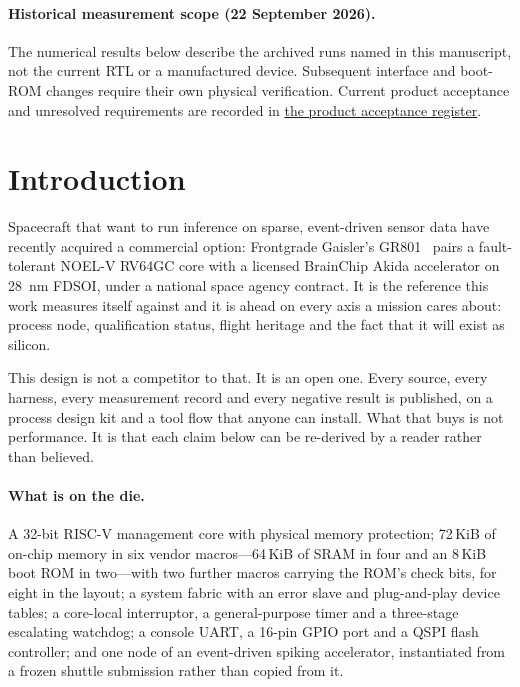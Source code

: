\documentclass[11pt,a4paper]{article}
\begin{document}
\paragraph{Historical measurement scope (22 September 2026).}
The numerical results below describe the archived runs named in this
manuscript, not the current RTL or a manufactured device. Subsequent
interface and boot-ROM changes require their own physical verification.
Current product acceptance and unresolved requirements are recorded in
\href{https://github.com/Melihakbulut221/nssoc/blob/codex/complete-open-work/docs/92-product-acceptance.md}{the product acceptance register}.


\section{Introduction}
\label{sec:intro}

Spacecraft that want to run inference on sparse, event-driven sensor data
have recently acquired a commercial option: Frontgrade Gaisler's
GR801~\cite{gr801}
pairs a fault-tolerant NOEL-V RV64GC core with a licensed BrainChip
Akida accelerator on \SI{28}{\nano\meter} FDSOI, under a national space
agency contract. It is the reference this work measures itself against
and it is ahead on every axis a mission cares about: process node,
qualification status, flight heritage and the fact that it will exist as
silicon.

This design is not a competitor to that. It is an open one. Every
source, every harness, every measurement record and every negative
result is published, on a process design kit and a tool flow that anyone
can install. What that buys is not performance. It is that each claim
below can be re-derived by a reader rather than believed.

\paragraph{What is on the die.} A \num{32}-bit RISC-V management core
with physical memory protection; \num{72}\,KiB of on-chip memory in six
vendor macros---\num{64}\,KiB of SRAM in four and an \num{8}\,KiB boot
ROM in two---with two further macros carrying the ROM's check bits, for
eight in the layout; a system fabric with an error slave and
plug-and-play device tables; a core-local interruptor, a general-purpose
timer and a three-stage escalating watchdog; a console UART, a
\num{16}-pin GPIO port and a QSPI flash controller; and one node of an
event-driven spiking accelerator, instantiated from a frozen shuttle
submission rather than copied from it.
\end{document}
